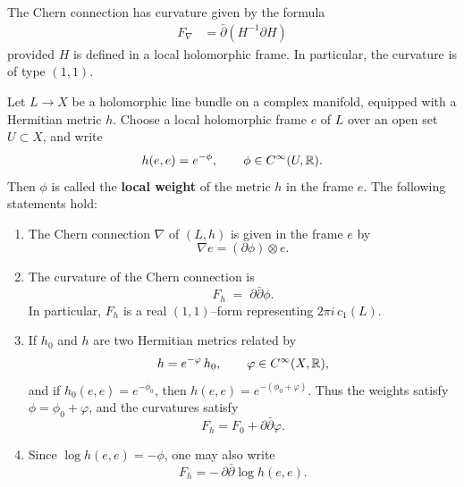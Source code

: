 \documentclass[12pt]{article}
\begin{document}
    \begin{proposition}
        The Chern connection has curvature given by the formula \begin{align*}
            F_\nabla & = \bar{\partial}(H^{-1} \partial H)
        \end{align*} provided $H$ is defined in a local holomorphic frame. In particular, the curvature is of type $(1,1)$.
    \end{proposition}

\begin{theorem}
Let $L\to X$ be a holomorphic line bundle on a complex manifold, equipped with a
Hermitian metric $h$.  Choose a local holomorphic frame $e$ of $L$ over an open
set $U\subset X$, and write
\[
h(e,e) = e^{-\phi},
\qquad \phi\in C^\infty(U,\mathbb{R}).
\]
Then $\phi$ is called the \textbf{local weight} of the metric $h$ in the frame
$e$.  The following statements hold:

\begin{enumerate}
\item 
The Chern connection $\nabla$ of $(L,h)$ is given in the frame $e$ by
\[
\nabla e = (\partial\phi)\otimes e.
\]

\item
The curvature of the Chern connection is
\[
F_h \;=\; \partial\bar\partial\phi.
\]
In particular, $F_h$ is a real $(1,1)$--form representing $2\pi i\,c_1(L)$.

\item
If $h_0$ and $h$ are two Hermitian metrics related by
\[
h = e^{-\varphi}\,h_0,
\qquad \varphi\in C^\infty(X,\mathbb{R}),
\]
and if $h_0(e,e)=e^{-\phi_0}$, then $h(e,e)=e^{-(\phi_0+\varphi)}$.  Thus the
weights satisfy $\phi=\phi_0+\varphi$, and the curvatures satisfy
\[
F_h = F_0 + \partial\bar\partial\varphi.
\]

\item
Since $\log h(e,e)=-\phi$, one may also write
\[
F_h = -\,\partial\bar\partial \log h(e,e).
\]
\end{enumerate}
\end{theorem}
\end{document}
